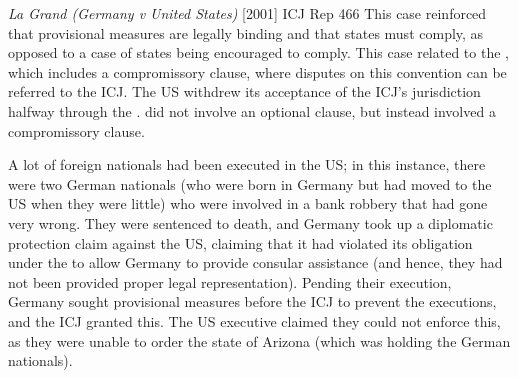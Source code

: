 \begin{casedetails}{\textit{La Grand (Germany v United States)} [2001] ICJ Rep 466}
    \flushleft
    This case reinforced that provisional measures are legally binding and that states must comply, as opposed to a case of states being encouraged to comply. This case related to the , which includes a compromissory clause, where disputes on this convention can be referred to the ICJ. The US withdrew its acceptance of the ICJ's jurisdiction halfway through the .  did not involve an optional clause, but instead involved a compromissory clause.

    \vspace{\baselineskip}

    A lot of foreign nationals had been executed in the US; in this instance, there were two German nationals (who were born in Germany but had moved to the US when they were little) who were involved in a bank robbery that had gone very wrong. They were sentenced to death, and Germany took up a diplomatic protection claim against the US, claiming that it had violated its obligation under the  to allow Germany to provide consular assistance (and hence, they had not been provided proper legal representation). Pending their execution, Germany sought provisional measures before the ICJ to prevent the executions, and the ICJ granted this. The US executive claimed they could not enforce this, as they were unable to order the state of Arizona (which was holding the German nationals).
\end{casedetails}

